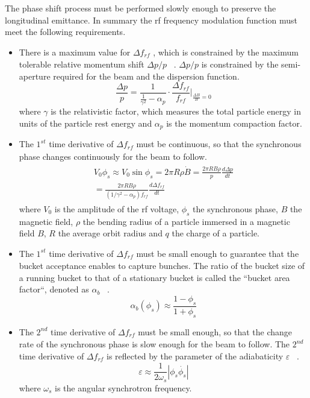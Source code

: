 The phase shift process must be performed slowly enough to preserve the longitudinal emittance. In summary the rf frequency modulation function must meet the following requirements.   
\begin{itemize}
	\item There is a maximum value for $\Delta f_\mathit{rf}$ , which is constrained by the maximum tolerable relative momentum shift $\Delta p/p$ ~\cite{bovet_selection_1970}. $\Delta p/p$ is constrained by the semi-aperture required for the beam and the dispersion function. 
\begin{equation}
\frac{\Delta{p}}{p}  = \frac{1}{\frac{1}{\gamma^2}-\alpha_{\mathit{p}}}\cdot \frac{\Delta f_{\mathit{rf}}}{f_{\mathit{rf}}}|_{\frac{\Delta{B}}{B}=0}
\label{eq:phaseP11}
\end{equation}
where $\gamma$ is the relativistic factor, which measures the total particle energy in units of the particle rest energy and $\alpha_{\mathit{p}}$ is the momentum compaction factor.

	\item The $1^\mathit{st}$ time derivative of $\Delta f_\mathit{rf}$ must be continuous, so that the synchronous phase changes continuously for the beam to follow. 
\begin{eqnarray}
\begin{aligned}
	V_0\phi_s\approx V_0\sin\phi_s=2\pi R\rho\dot{B}=\frac{2\pi R B\rho}{p} \frac{d \Delta p}{dt}\\=\frac{2\pi R B\rho}{(1/\gamma^2-\alpha_p)f_\mathit{rf}} \frac{d \Delta f_\mathit{rf}}{dt}\label{eq2}
\end{aligned}
\end{eqnarray}
where $V_0$ is the amplitude of the rf voltage, $\phi_s$ the synchronous phase, $B$ the magnetic field, $\rho$ the bending radius of a particle immersed in a magnetic field $B$, $R$ the average orbit radius and $q$ the charge of a particle.
	\item The $1^\mathit{st}$ time derivative of $\Delta f_\mathit{rf}$ must be small enough to guarantee that the bucket acceptance enables to capture bunches. 
The ratio of the bucket size of a running bucket to that of a stationary bucket is called the ``bucket area factor``, denoted as $\alpha_b$ ~\cite{lee_accelerator_2011}.
\begin{equation} 
\label{bucket_size}
\alpha_b(\phi_{s})\approx \frac{1-\phi_{s}}{1+\phi_{s}}
\end{equation} 
	\item The $2^\mathit{nd}$ time derivative of $\Delta f_\mathit{rf}$ must be small enough, so that the change rate of the synchronous phase is slow enough for the beam to follow. The $2^\mathit{nd}$ time derivative of $\Delta f_\mathit{rf}$ is reflected by the parameter of the adiabaticity $\varepsilon$ ~\cite{ezura_beam-dynamics_2008}.
\begin{equation}
\varepsilon \approx \frac{1}{2\omega_s}|\phi_s\dot{\phi_{s}}|
\label{eq:derivation1}
\end{equation} 
where $\omega_s$ is the angular synchrotron frequency.
\end{itemize}

